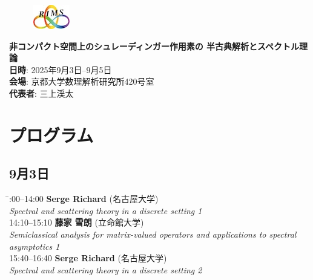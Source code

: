 \documentclass[a4paper,11pt]{article}
\numberwithin{equation}{section}
\begin{document}
\pagestyle{empty}



\begin{figure}
  \centering
  \includegraphics[bb=0 0 0.2 0.15]{mugenRIMS2.jpg}
\end{figure}

\begin{center}
{\fontsize{16pt}{18pt}\selectfont \bfseries 非コンパクト空間上のシュレーディンガー作用素の
半古典解析とスペクトル理論}\\
  \textbf{日時}: 2025年9月3日--9月5日\\
  \textbf{会場}: 京都大学数理解析研究所420号室\\
  \textbf{代表者}:  三上渓太
\end{center}

\section*{プログラム}

\subsection*{9月3日}
\begin{tabbing}
  \hspace{3cm}\=:00--14:00 \> \textbf{Serge Richard}  (名古屋大学)\\
                \> \emph{Spectral and scattering theory in a discrete setting 1}\\

  14:10--15:10 \> \textbf{藤家 雪朗}  (立命館大学)\\
                \> \emph{Semiclassical analysis for matrix-valued operators
and applications to spectral}\\
               \> \emph{ asymptotics 1}\\

  15:40--16:40 \> \textbf{Serge Richard}  (名古屋大学)\\
                \> \emph{Spectral and scattering theory in a discrete setting 2}
\end{tabbing}
\end{document}
